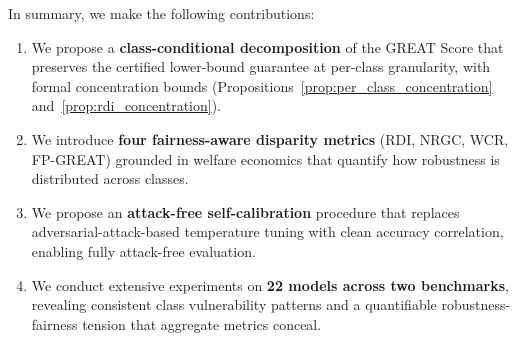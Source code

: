 In summary, we make the following contributions:
\begin{enumerate}
    \item We propose a \textbf{class-conditional decomposition} of the GREAT Score that preserves the certified lower-bound guarantee at per-class granularity, with formal concentration bounds (Propositions~\ref{prop:per_class_concentration} and~\ref{prop:rdi_concentration}).
    \item We introduce \textbf{four fairness-aware disparity metrics} (RDI, NRGC, WCR, FP-GREAT) grounded in welfare economics that quantify how robustness is distributed across classes.
    \item We propose an \textbf{attack-free self-calibration} procedure that replaces adversarial-attack-based temperature tuning with clean accuracy correlation, enabling fully attack-free evaluation.
    \item We conduct extensive experiments on \textbf{22 models across two benchmarks}, revealing consistent class vulnerability patterns and a quantifiable robustness-fairness tension that aggregate metrics conceal.
\end{enumerate}